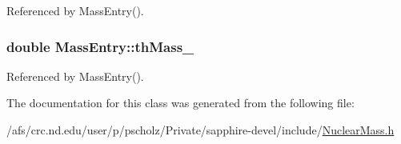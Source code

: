 Referenced by Mass\-Entry().

\hypertarget{classMassEntry_a8fd951ec49bba7068699a48c44e9041b}{
\subsubsection[{th\-Mass\-\_\-}]{\setlength{\rightskip}{0pt plus 5cm}double Mass\-Entry\-::th\-Mass\-\_\-}}\label{classMassEntry_a8fd951ec49bba7068699a48c44e9041b}


Referenced by Mass\-Entry().



The documentation for this class was generated from the following file\-:\begin{DoxyCompactItemize}
\item 
/afs/crc.\-nd.\-edu/user/p/pscholz/\-Private/sapphire-\/devel/include/\hyperlink{NuclearMass_8h}{Nuclear\-Mass.\-h}\end{DoxyCompactItemize}
